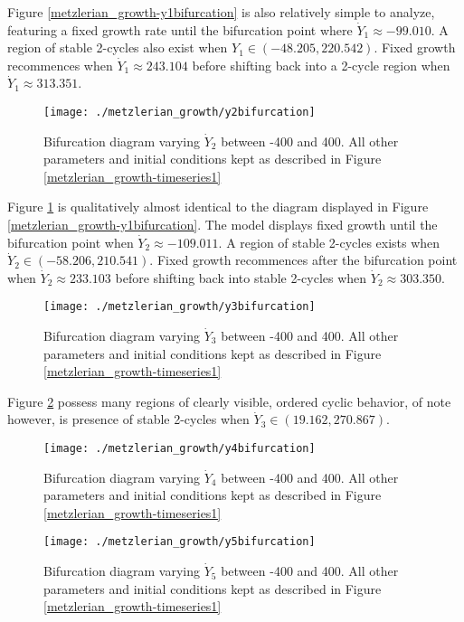 Figure \ref{metzlerian_growth-y1bifurcation} is also relatively simple to analyze, featuring a fixed growth rate until the bifurcation point where $\dot Y_1\approx -99.010$. A region of stable 2-cycles also exist when $Y_1\in(-48.205,220.542)$. Fixed growth recommences when $\dot Y_1\approx 243.104$ before shifting back into a 2-cycle region when $\dot Y_1\approx 313.351$. 

\begin{figure}
    \centering
    \texttt{[image: ./metzlerian\_growth/y2bifurcation]}
    \caption{Bifurcation diagram varying $\dot Y_2$ between -400 and 400. All other parameters and initial conditions kept as described in Figure \ref{metzlerian_growth-timeseries1}}
    \label{metzlerian_growth-y2bifurcation}
\end{figure}

Figure \ref{metzlerian_growth-y2bifurcation} is qualitatively almost identical to the diagram displayed in Figure \ref{metzlerian_growth-y1bifurcation}. The model displays fixed growth until the bifurcation point when $\dot Y_2\approx -109.011$. A region of stable 2-cycles exists when $\dot Y_2\in(-58.206, 210.541)$. Fixed growth recommences after the bifurcation point when $\dot Y_2\approx 233.103$ before shifting back into stable 2-cycles when $\dot Y_2\approx 303.350$. 

\begin{figure}
    \centering
    \texttt{[image: ./metzlerian\_growth/y3bifurcation]}
    \caption{Bifurcation diagram varying $\dot Y_3$ between -400 and 400. All other parameters and initial conditions kept as described in Figure \ref{metzlerian_growth-timeseries1}}
    \label{metzlerian_growth-y3bifurcation}
\end{figure}

Figure \ref{metzlerian_growth-y3bifurcation} possess many regions of clearly visible, ordered cyclic behavior, of note however, is presence of stable 2-cycles when $\dot Y_3\in (19.162, 270.867)$.

\begin{figure}
    \centering
    \texttt{[image: ./metzlerian\_growth/y4bifurcation]}
    \caption{Bifurcation diagram varying $\dot Y_4$ between -400 and 400. All other parameters and initial conditions kept as described in Figure \ref{metzlerian_growth-timeseries1}}
    \label{metzlerian_growth-y4bifurcation}
\end{figure}

\begin{figure}
    \centering
    \texttt{[image: ./metzlerian\_growth/y5bifurcation]}
    \caption{Bifurcation diagram varying $\dot Y_5$ between -400 and 400. All other parameters and initial conditions kept as described in Figure \ref{metzlerian_growth-timeseries1}}
    \label{metzlerian_growth-y5bifurcation}
\end{figure}

